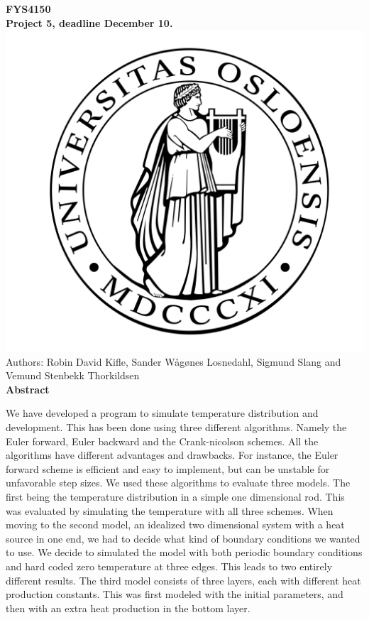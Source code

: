\documentclass[10pt,a4paper]{article}
\begin{document}
\begin{center}

{\LARGE\bf
FYS4150\\
\vspace{0.5cm}
Project 5, deadline December 10.
}
 \includegraphics[scale=0.075]{figures/uio.png}\\
Authors: Robin David Kifle, Sander Wågønes Losnedahl, Sigmund Slang and Vemund Stenbekk Thorkildsen\\
\vspace{1cm}
{\LARGE\bf
Abstract
}\\
\end{center}
We have developed a program to simulate temperature distribution and development. This has been done using three different algorithms. Namely the Euler forward, Euler backward and the Crank-nicolson schemes. All the algorithms have different advantages and drawbacks. For instance, the Euler forward scheme is efficient and easy to implement, but can be unstable for unfavorable step sizes. We used these algorithms to evaluate three models. The first being the temperature distribution in a simple one dimensional rod. This was evaluated by simulating the temperature with all three schemes. When moving to the second model, an idealized two dimensional system with a heat source in one end, we had to decide what kind of boundary conditions we wanted to use. We decide to simulated the model with both periodic boundary conditions and hard coded zero temperature at three edges. This leads to two entirely different results. The third model consists of three layers, each with different heat production constants. This was first modeled with the initial parameters, and then with an extra heat production in the bottom layer.  
\end{document}
